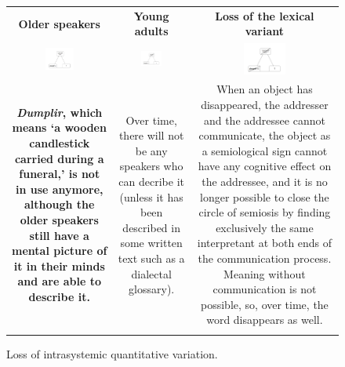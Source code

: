 \documentclass[output=paper]{LSP/langsci}
\begin{document}
\begin{figure}
\begin{tabular}{ccc}
\lsptoprule
{\bfseries Older speakers} & {\bfseries Young adults} &
\begin{minipage}[t]{0.3\textwidth}{\bfseries Loss of the lexical variant}\end{minipage}\\
\includegraphics[width=0.3\textwidth]{illustrations/skevin_fig21} &
\includegraphics[width=0.3\textwidth]{illustrations/skevin_fig22} &
\includegraphics[width=0.3\textwidth]{illustrations/skevin_fig23}\\
\begin{minipage}[t]{0.3\textwidth}{\bfseries \textit{Dumplir}, which means `a wooden candlestick carried during a funeral,' is not in use anymore, although the older speakers still have a mental picture of it in their minds and are able to describe it.}\end{minipage} & 
\begin{minipage}[t]{0.3\textwidth}Over time, there will not be any speakers who  can decribe it (unless it has been described in some written text such as a dialectal glossary).\end{minipage} & 
\begin{minipage}[t]{0.3\textwidth}When an object has disappeared, the addresser and the addressee cannot communicate, the object as a semiological sign cannot have any cognitive effect on the addressee, and it is no longer possible to close the circle of semiosis by finding exclusively the same interpretant at both ends of the communication process. Meaning without communication is not possible, so, over time, the word disappears as well.\end{minipage}\\
\lspbottomrule
\end{tabular}
\label{fig:2}
\caption{Loss of intrasystemic quantitative variation.}
\end{figure}
\end{document}
